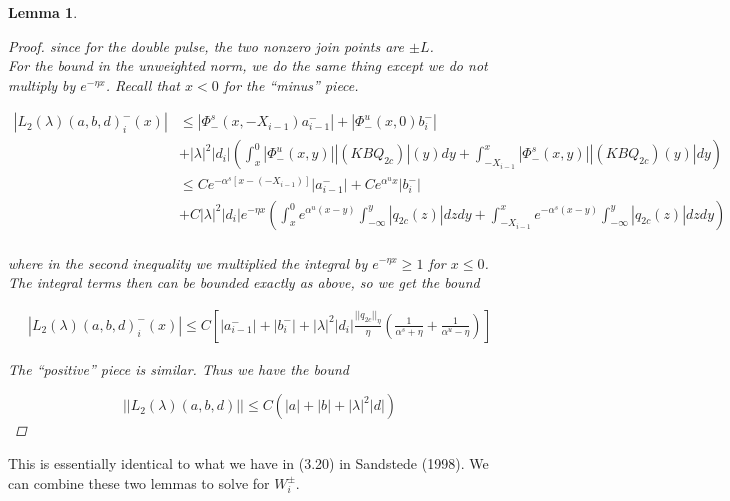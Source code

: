 \documentclass[12pt]{article}
\newtheorem{lemma}{Lemma}
\begin{document}
\begin{lemma}
\begin{proof}
since for the double pulse, the two nonzero join points are $\pm L$.\\

For the bound in the unweighted norm, we do the same thing except we do not multiply by $e^{-\eta x}$. Recall that $x < 0$ for the ``minus'' piece.

\begin{align*}
| L_2(\lambda)(a, b, d)_i^-(x)| &\leq |\Phi^s_-(x, -X_{i-1})a^-_{i-1}| + |\Phi^u_-(x, 0)b_i^-| \\
&+ |\lambda|^2 |d_i| \left( \int_x^0 |\Phi^u_-(x, y)||(KBQ_{2c})|(y) dy  + \int_{-X_{i-1}}^x |\Phi^s_-(x, y)||(KBQ_{2c})(y)| dy \right) \\
&\leq C e^{-\alpha^s [x - (-X_{i-1})]}|a^-_{i-1}| + C e^{\alpha^u x}|b_i^-| \\
&+ C|\lambda|^2 |d_i| e^{-\eta x} \left( \int_x^0 e^{\alpha^u (x - y)}\int_{-\infty}^y |q_{2c}(z)| dz dy  + \int_{-X_{i-1}}^x e^{-\alpha^s (x - y)}\int_{-\infty}^y |q_{2c}(z)| dz dy\right) \\
\end{align*}

where in the second inequality we multiplied the integral by $e^{-\eta x} \geq 1$ for $x \leq 0$. The integral terms then can be bounded exactly as above, so we get the bound

\begin{align*}
| L_2(\lambda)(a, b, d)_i^-(x)| \leq C \left[ |a^-_{i-1}| + |b_i^-| + |\lambda|^2 |d_i|  \frac{ ||q_{2c}||_\eta }{\eta} \left( \frac{1}{\alpha^s + \eta} + \frac{1}{\alpha^u - \eta} \right)\right]
\end{align*}

The ``positive'' piece is similar. Thus we have the bound 

\[
||L_2(\lambda)(a, b, d)|| \leq C(|a| + |b| + |\lambda|^2 |d|)
\]

\end{proof}

\end{lemma}

This is essentially identical to what we have in (3.20) in Sandstede (1998). We can combine these two lemmas to solve for $W_i^\pm$.
\end{document}
